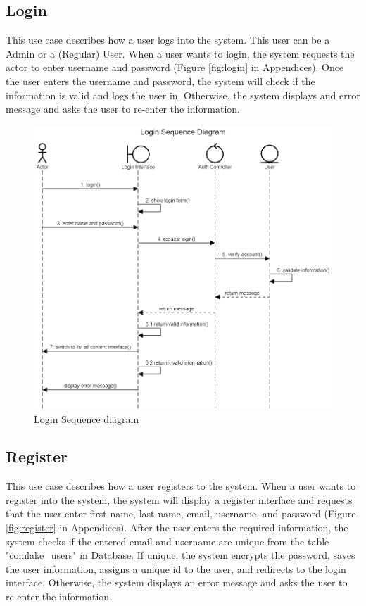 \subsection{Login}
This use case describes how a user logs into the system. This user can be a Admin or a (Regular) User. When a user wants to login, the system requests the actor to enter username and password (Figure \ref{fig:login} in Appendices). Once the user enters the username and password, the system will check if the information is valid and logs the user in. Otherwise, the system displays and error message and asks the user to re-enter the information. 
\begin{figure}[H]
    \centering
    \includegraphics[width=1.0\textwidth]{images/LoginSequence.png}
    \caption{Login Sequence diagram}
    \label{fig:LoginSeq}
\end{figure}

\subsection{Register}
This use case describes how a user registers to the system. When a user wants to register into the system, the system will display a register interface and requests that the user enter first name, last name, email, username, and password (Figure \ref{fig:register} in Appendices). After the user enters the required information, the system checks if the entered email and username are unique from the table "comlake\_users" in Database. If unique, the system encrypts the password, saves the user information, assigns a unique id to the user, and redirects to the login interface. Otherwise, the system displays an error message and asks the user to re-enter the information.

